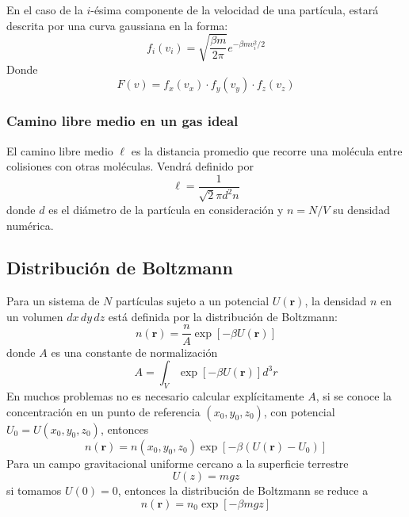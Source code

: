 \documentclass[]{article}
\numberwithin{equation}{section}
\newcommand{\0}{\textcolor{gray}{0}}
\newcommand{\rv}{\mathbf{r}}
\begin{document}
En el caso de la \(i\)-ésima componente de la velocidad de una partícula, estará descrita por una curva gaussiana en la forma:
\begin{equation}
	f_i(v_i) = \sqrt{\frac{\beta m}{2\pi}} e^{-\beta m v_i^2/2}
\end{equation}
Donde
\begin{equation}
	F(v) = f_x(v_x)\cdot f_y(v_y)\cdot f_z(v_z)
\end{equation}

\subsubsection{Camino libre medio en un gas ideal}
El camino libre medio \(\ell\) es la distancia promedio que recorre una molécula entre colisiones con otras moléculas. Vendrá definido por
\begin{equation}
	\ell = \frac{1}{\sqrt{2} \pi d^2 n}
\end{equation}
donde \(d\) es el diámetro de la partícula en consideración y \(n = N/V\) su densidad numérica.

\subsection{Distribución de Boltzmann}
Para un sistema de \(N\) partículas sujeto a un potencial \(U(\rv)\), la densidad \(n\) en un volumen \(dx \, dy \, dz\) está definida por la distribución de Boltzmann:
\begin{equation}
	n(\rv) = \frac{n}{A} \exp\left[- \beta U(\rv)\right]
\end{equation}
donde \(A\) es una constante de normalización
\begin{equation}
	A = \int_{V} \exp\left[- \beta U(\rv)\right] d^3 r
\end{equation}
En muchos problemas no es necesario calcular explícitamente \(A\), si se conoce la concentración en un punto de referencia \((x_0, y_0, z_0)\), con potencial \(U_0 = U(x_0, y_0, z_0)\), entonces
\begin{equation}
	n(\rv) = n(x_0, y_0, z_0) \exp\left[- \beta\left(U(\rv) - U_0\right)\right]
\end{equation}
Para un campo gravitacional uniforme cercano a la superficie terrestre
\begin{equation*}
	U(z) = m g z
\end{equation*}
si tomamos \(U(0) = 0\), entonces la distribución de Boltzmann se reduce a
\begin{equation}
	n(\rv) = n_0 \exp\left[- \beta m g z\right] \label{Boltzmann_grav}
\end{equation}
\end{document}
